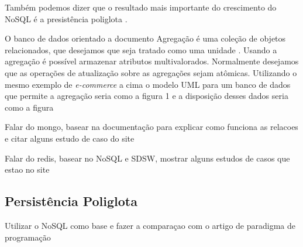 Também podemos dizer que o resultado mais importante do crescimento do NoSQL é a presistência poliglota \cite{NoSQL}.


O banco de dados orientado a documento
Agregação é uma coleção de objetos relacionados, que desejamos que seja tratado como uma unidade \cite{NoSQL}. Usando a agregação é possível armazenar atributos multivalorados. Normalmente desejamos que as operações de atualização sobre as agregações sejam atômicas.
Utilizando o mesmo exemplo de \textit{e-commerce} a cima o modelo UML para um banco de dados que permite a agregação seria como a figura 1 e a disposição desses dados seria como a figura

Falar do mongo, basear na documentação para explicar como funciona as relacoes e citar alguns estudo de caso do site


Falar do redis, basear no NoSQL e SDSW, mostrar alguns estudos de casos que estao no site



\subsection{Persistência Poliglota}
\label{subsec:polyglotpersitence}
Utilizar o NoSQL como base e fazer a comparaçao com o artigo de paradigma de programação

